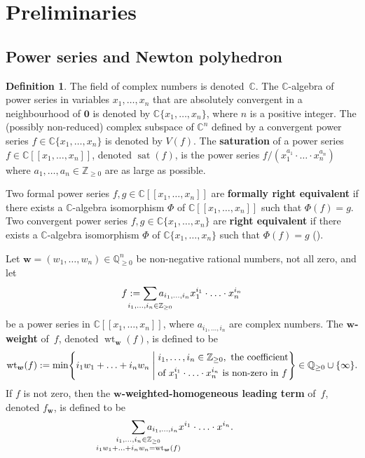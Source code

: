 \documentclass[a4paper, 12pt, oneside]{article}
\theoremstyle{plain}
\theoremstyle{definition}
\newtheorem{definition}[theorem]{Definition}
\theoremstyle{remark}
\numberwithin{theorem}{section}
\numberwithin{table}{section}
\numberwithin{equation}{theorem}
\begin{document}
\section{Preliminaries}

\subsection{Power series and Newton polyhedron}

\begin{definition}
The field of complex numbers is denoted~$\mathbb C$.
The $\mathbb C$-algebra of power series in variables $x_1, \ldots, x_n$ that are absolutely convergent in a neighbourhood of $\bm 0$ is denoted by $\mathbb C\{x_1, \ldots, x_n\}$, where $n$ is a positive integer.
The (possibly non-reduced) complex subspace of $\mathbb C^n$ defined by a convergent power series $f \in \mathbb C\{x_1, \ldots, x_n\}$ is denoted by $V(f)$.
The \textbf{saturation} of a power series $f \in \mathbb C[[x_1, \ldots, x_n]]$, denoted $\operatorname{sat}(f)$, is the power series $f / (x_1^{a_1} \cdot \ldots \cdot x_n^{a_n})$ where $a_1, \ldots, a_n \in \mathbb Z_{\geq0}$ are as large as possible.

Two formal power series $f, g \in \mathbb C[[x_1, \ldots, x_n]]$ are \textbf{formally right equivalent} if there exists a $\mathbb C$-algebra isomorphism $\Phi$ of $\mathbb C[[x_1, \ldots, x_n]]$ such that $\Phi(f) = g$. Two convergent power series $f, g \in \mathbb C\{x_1, \ldots, x_n\}$ are \textbf{right equivalent} if there exists a $\mathbb C$-algebra isomorphism $\Phi$ of $\mathbb C\{x_1, \ldots, x_n\}$ such that $\Phi(f) = g$ (\cite[Definition~I.2.9]{GLS07}).

Let $\bm w = (w_1, \ldots, w_n) \in \mathbb Q_{\geq0}^n$ be non-negative rational numbers, not all zero, and let
\[
f := \sum_{\crampedclap{i_1, \ldots, i_n \in \mathbb Z_{\geq0}}} a_{i_1, \ldots, i_n} x_1^{i_1} \cdot \ldots \cdot x_n^{i_n}
\]
be a power series in $\mathbb C[[x_1, \ldots, x_n]]$, where $a_{i_1, \ldots, i_n}$ are complex numbers. The \textbf{$\bm w$-weight} of~$f$, denoted $\operatorname{wt}_{\bm w}(f)$, is defined to be
\[
\operatorname{wt}_{\bm w}(f) := \min \mleft\{ i_1 w_1 + \ldots + i_n w_n \;\middle|\; \begin{aligned}
  & i_1, \ldots, i_n \in \mathbb Z_{\geq0},~ \text{the coefficient}\\
  & \text{of } x_1^{i_1} \cdot \ldots \cdot x_n^{i_n} \text{ is non-zero in~$f$}
\end{aligned} \mright\} \in \mathbb Q_{\geq0} \cup \{\infty\}.
\]
If $f$ is not zero, then the \textbf{$\bm w$-weighted-homogeneous leading term} of~$f$, denoted $f_{\bm w}$, is defined to be
\[
\sum_{\crampedclap{\substack{i_1, \ldots, i_n \in \mathbb Z_{\geq0}\\i_1 w_1 + \ldots + i_n w_n = \operatorname{wt}_{\bm w}(f)}}} a_{i_1, \ldots, i_n} x^{i_1} \cdot \ldots \cdot x^{i_n}.
\]
\end{definition}
\end{document}
